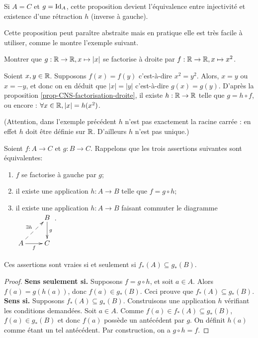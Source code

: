 \begin{remarque} Si $A=C$ et $g=\operatorname{Id}_A$, cette proposition devient l'équivalence entre injectivité et existence d'une rétraction $h$ (inverse à gauche).
\end{remarque}

Cette proposition peut paraître abstraite mais en pratique elle est très facile à utiliser, comme le montre l'exemple suivant.
\begin{exemple}
Montrer que $g : \mathbb{R}\to\mathbb{R}, x\mapsto |x|$ se factorise à droite par $f : \mathbb{R}\to \mathbb{R}, x\mapsto x^2$.
\end{exemple}
\begin{red}
Soient $x, y\in \mathbb{R}$. Supposons $f(x)=f(y)$ c'est-à-dire $x^2=y^2$. Alors, $x=y$ ou $x=-y$, et donc on en déduit que $|x|=|y|$ c'est-à-dire $g(x)=g(y)$. D'après la proposition \ref{prop-CNS-factorisation-droite}, il existe $h : \mathbb{R}\to \mathbb{R}$ telle que $g =h\circ f$, ou encore : $\forall x\in \mathbb{R}, |x|=h(x^2)$. 
\end{red}

(Attention, dans l'exemple précédent $h$ n'est pas exactement la racine carrée : en effet $h$ doit être définie sur $\mathbb{R}$. D'ailleurs $h$ n'est pas unique.)




\begin{proposition}
\label{prop-CNS-factorisation-gauche}
Soient $f : A\to C$ et $g : B\to C$. Rappelons que les trois assertions suivantes sont équivalentes:
\begin{enumerate}
\item  $f$ se factorise à gauche par $g$;
\item il existe une application $h : A\to B$ telle que $f = g\circ h$;
\item il existe une application $h : A\to B$ faisant commuter le diagramme  
$\xymatrix{
&B \ar[d]^{g} \\
A \ar[r]_f \ar@{-->}[ur]^{\exists h}& C
}$.
\end{enumerate}
Ces assertions sont vraies si et seulement si $f_*(A)\subseteq g_*(B)$.
\end{proposition}
\begin{proof}
\textbf{Sens \og seulement si\fg.} Supposons $f = g\circ h$, et soit $a\in A$. Alors $f(a) = g(h(a))$, donc $f(a) \in g_*(B)$. Ceci prouve que $f_*(A)\subseteq g_*(B)$.\\
\textbf{Sens \og si\fg.} Supposons $f_*(A)\subseteq g_*(B)$. Construisons une application $h$ vérifiant les conditions demandées. Soit $a\in A$. Comme $f(a) \in f_*(A) \subseteq g_*(B)$, $f(a) \in g_*(B)$ et donc $f(a)$ possède un antécédent par $g$. On définit $h(a)$ comme étant un tel antécédent. Par construction, on a $g\circ h = f$.
\end{proof}

